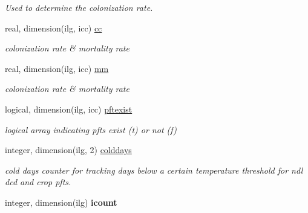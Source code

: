 \begin{DoxyCompactItemize}
\begin{DoxyCompactList}\small\item\em Used to determine the colonization rate. \end{DoxyCompactList}\item 
\hypertarget{structctem__statevars_1_1veg__gat_a75198e0f1eaa08203065279bd6ba9a90}{}real, dimension(ilg, icc) \hyperlink{structctem__statevars_1_1veg__gat_a75198e0f1eaa08203065279bd6ba9a90}{cc}\label{structctem__statevars_1_1veg__gat_a75198e0f1eaa08203065279bd6ba9a90}

\begin{DoxyCompactList}\small\item\em colonization rate \& mortality rate \end{DoxyCompactList}\item 
\hypertarget{structctem__statevars_1_1veg__gat_a4f406d320dbab403e7f24db145f509b9}{}real, dimension(ilg, icc) \hyperlink{structctem__statevars_1_1veg__gat_a4f406d320dbab403e7f24db145f509b9}{mm}\label{structctem__statevars_1_1veg__gat_a4f406d320dbab403e7f24db145f509b9}

\begin{DoxyCompactList}\small\item\em colonization rate \& mortality rate \end{DoxyCompactList}\item 
\hypertarget{structctem__statevars_1_1veg__gat_ac0ca3c2b4e99f1f11695ddc79f4af1d8}{}logical, dimension(ilg, icc) \hyperlink{structctem__statevars_1_1veg__gat_ac0ca3c2b4e99f1f11695ddc79f4af1d8}{pftexist}\label{structctem__statevars_1_1veg__gat_ac0ca3c2b4e99f1f11695ddc79f4af1d8}

\begin{DoxyCompactList}\small\item\em logical array indicating pfts exist (t) or not (f) \end{DoxyCompactList}\item 
\hypertarget{structctem__statevars_1_1veg__gat_a2792cfb0114cf9a14722a8688742a251}{}integer, dimension(ilg, 2) \hyperlink{structctem__statevars_1_1veg__gat_a2792cfb0114cf9a14722a8688742a251}{colddays}\label{structctem__statevars_1_1veg__gat_a2792cfb0114cf9a14722a8688742a251}

\begin{DoxyCompactList}\small\item\em cold days counter for tracking days below a certain temperature threshold for ndl dcd and crop pfts. \end{DoxyCompactList}\item 
\hypertarget{structctem__statevars_1_1veg__gat_a76468305f7fc177057cbf1588bf7a09e}{}integer, dimension(ilg) {\bfseries icount}\label{structctem__statevars_1_1veg__gat_a76468305f7fc177057cbf1588bf7a09e}


\end{DoxyCompactItemize}
